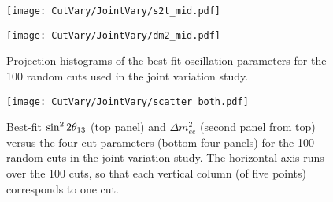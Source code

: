\documentclass[../thesis.tex]{subfiles}
\begin{document}
\begin{figure}[ht]
  \begin{minipage}{0.5\linewidth}%
    \texttt{[image: CutVary/JointVary/s2t\_mid.pdf]}%
  \end{minipage}%
  \begin{minipage}{0.5\linewidth}%
    \texttt{[image: CutVary/JointVary/dm2\_mid.pdf]}%
  \end{minipage}%
  \caption{Projection histograms of the best-fit oscillation parameters for the 100 random cuts used in the joint variation study.}
  \label{fig:cutVaryJointVaryResults}
\end{figure}

\begin{figure}[h]
  \texttt{[image: CutVary/JointVary/scatter\_both.pdf]}
  \caption{Best-fit $\sin^2 2\theta_{13}$ (top panel) and $\Delta m^2_{ee}$ (second panel from top) versus the four cut parameters (bottom four panels) for the 100 random cuts in the joint variation study. The horizontal axis runs over the 100 cuts, so that each vertical column (of five points) corresponds to one cut.}
  \label{fig:cutVaryJointVaryScatter}
\end{figure}

\end{document}
